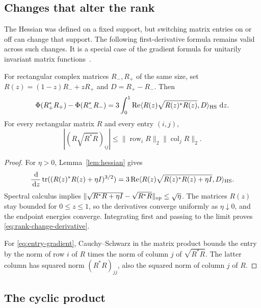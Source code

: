 \subsection{Changes that alter the rank}

The Hessian was defined on a fixed support, but switching matrix
entries on or off can change that support.  The following
first-derivative formula remains valid across such changes.  It is
a special case of the gradient formula for unitarily invariant
matrix functions~\cite[Theorem~3.1]{Lewis1995}.

\begin{lemma}
\label{lem:rank-change}
For rectangular complex matrices $R_-,R_+$ of the same size, set
$R(z)=(1-z)R_-+zR_+$ and $D=R_+-R_-$.  Then
\begin{equation}\label{eq:rank-change-derivative}
 \Phi(R_+^*R_+)-\Phi(R_-^*R_-)
 =3\int_0^1\operatorname{Re}
 \langle R(z)\sqrt{R(z)^*R(z)},D\rangle_{\mathrm{HS}}\,\,\mathrm d z.
\end{equation}
For every rectangular matrix $R$ and every entry $(i,j)$,
\begin{equation}\label{eq:entry-gradient}
 |(R\sqrt{R^*R})_{ij}|
 \le\lVert\operatorname{row}_iR\rVert_2
       \lVert\operatorname{col}_jR\rVert_2.
\end{equation}
\end{lemma}

\begin{proof}
For $\eta>0$, Lemma~\ref{lem:hessian} gives
\[
 \frac{\,\mathrm d}{\,\mathrm d z}\operatorname{tr}((R(z)^*R(z)+\eta I)^{3/2})
 =3\operatorname{Re}
 \langle R(z)\sqrt{R(z)^*R(z)+\eta I},D\rangle_{\mathrm{HS}}.
\]
Spectral calculus implies
$\lVert\sqrt{R^*R+\eta I}-\sqrt{R^*R}\rVert_{\mathrm{op}}\le\sqrt\eta$.
The matrices $R(z)$ stay bounded for $0\le z\le1$, so the
derivatives converge uniformly as $\eta\downarrow0$, and the
endpoint energies converge.  Integrating first and passing to the
limit proves \eqref{eq:rank-change-derivative}.

For \eqref{eq:entry-gradient}, Cauchy--Schwarz in the matrix product
bounds the entry by the norm of row $i$ of $R$ times the norm of
column $j$ of $\sqrt{R^*R}$.  The latter column has squared norm
$(R^*R)_{jj}$, also the squared norm of column $j$ of $R$.
\end{proof}

\subsection{The cyclic product}

